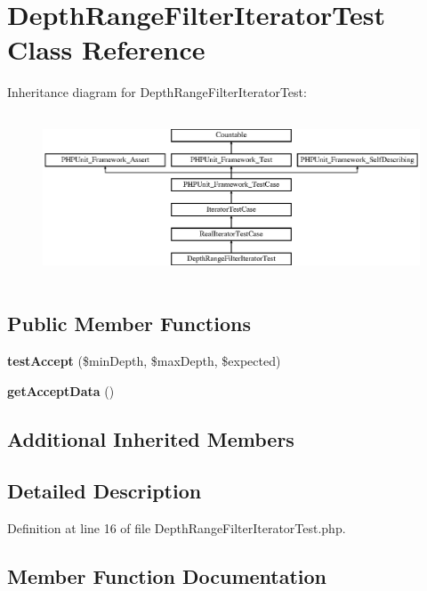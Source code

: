 \section{Depth\+Range\+Filter\+Iterator\+Test Class Reference}
\label{class_symfony_1_1_component_1_1_finder_1_1_tests_1_1_iterator_1_1_depth_range_filter_iterator_test}
Inheritance diagram for Depth\+Range\+Filter\+Iterator\+Test\+:\begin{figure}[H]
\begin{center}
\leavevmode
\includegraphics[height=4.955752cm]{class_symfony_1_1_component_1_1_finder_1_1_tests_1_1_iterator_1_1_depth_range_filter_iterator_test}
\end{center}
\end{figure}
\subsection*{Public Member Functions}
\begin{DoxyCompactItemize}
\item 
{\bf test\+Accept} (\$min\+Depth, \$max\+Depth, \$expected)
\item 
{\bf get\+Accept\+Data} ()
\end{DoxyCompactItemize}
\subsection*{Additional Inherited Members}


\subsection{Detailed Description}


Definition at line 16 of file Depth\+Range\+Filter\+Iterator\+Test.\+php.



\subsection{Member Function Documentation}
